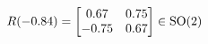 \documentclass[preview]{standalone}
\begin{document}
\begin{align*}
\special{dvisvgm:raw <g id='unique000'>}R(-0.84) = \begin{bmatrix} 0.67 & 0.75 \\ -0.75 & 0.67 \end{bmatrix} \in \text{SO}(2)\special{dvisvgm:raw </g>}
\end{align*}
\end{document}
